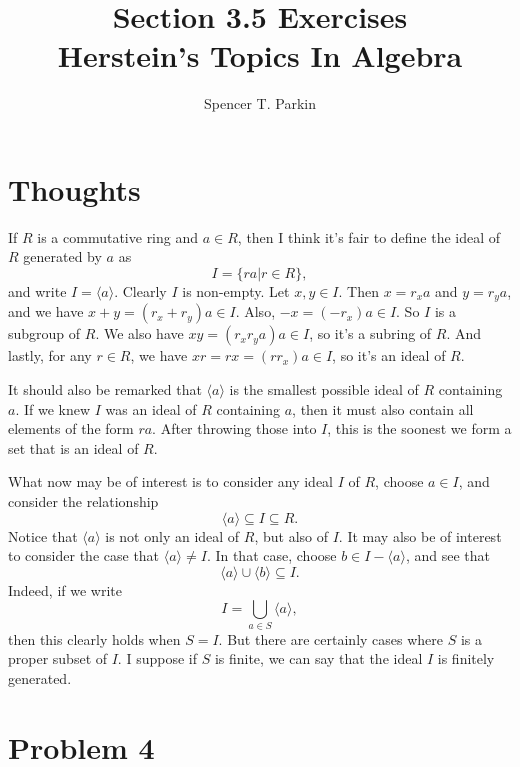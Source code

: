 \documentclass[12pt]{article}
\title{Section 3.5 Exercises\\Herstein's Topics In Algebra}
\author{Spencer T. Parkin}
\begin{document}
\maketitle

\section*{Thoughts}

If $R$ is a commutative ring and $a\in R$, then I think it's fair to define the ideal of $R$ generated by $a$ as
\begin{equation*}
I = \{ra|r\in R\},
\end{equation*}
and write $I=\langle a\rangle$.  Clearly $I$ is non-empty.  Let $x,y\in I$.  Then $x=r_xa$ and $y=r_ya$,
and we have $x+y=(r_x+r_y)a\in I$.  Also, $-x=(-r_x)a\in I$.  So $I$ is a subgroup of $R$.
We also have $xy=(r_xr_ya)a\in I$, so it's a subring of $R$.  And lastly, for any $r\in R$, we have
$xr=rx=(rr_x)a\in I$, so it's an ideal of $R$.

It should also be remarked that $\langle a\rangle$ is the smallest possible ideal of $R$ containing $a$.
If we knew $I$ was an ideal of $R$ containing $a$, then it must also contain all elements of the form $ra$.
After throwing those into $I$, this is the soonest we form a set that is an ideal of $R$.

What now may be of interest is to consider any ideal $I$ of $R$, choose $a\in I$, and consider
the relationship
\begin{equation*}
\langle a\rangle\subseteq I\subseteq R.
\end{equation*}
Notice that $\langle a\rangle$ is not only an ideal of $R$, but also of $I$.
It may also be of interest to consider
the case that $\langle a\rangle\neq I$.  In that case, choose $b\in I-\langle a\rangle$,
and see that
\begin{equation*}
\langle a\rangle\cup\langle b\rangle\subseteq I.
\end{equation*}
Indeed, if we write
\begin{equation*}
I = \bigcup_{a\in S}\langle a\rangle,
\end{equation*}
then this clearly holds when $S=I$.  But there are certainly cases where $S$ is a proper subset of $I$.
I suppose if $S$ is finite, we can say that the ideal $I$ is finitely generated.

\section*{Problem 4}
\end{document}
